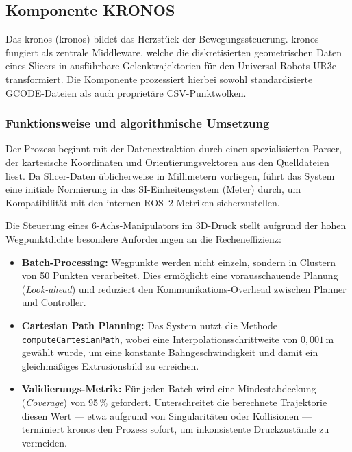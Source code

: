         \subsection{Komponente KRONOS}\label{subsec:component-kronos}
            Das \acl{kronos} (\acs{kronos}) bildet das Herzstück der Bewegungssteuerung.
            \ac{kronos} fungiert als zentrale Middleware, welche die diskretisierten geometrischen Daten eines Slicers in ausführbare Gelenktrajektorien für den Universal Robots UR3e transformiert.
            Die Komponente prozessiert hierbei sowohl standardisierte \ac{GCODE}-Dateien als auch proprietäre CSV-Punktwolken.

            \subsubsection{Funktionsweise und algorithmische Umsetzung}\label{subsubssec:functionality}
                Der Prozess beginnt mit der Datenextraktion durch einen spezialisierten Parser, der kartesische Koordinaten und Orientierungsvektoren aus den Quelldateien liest. 
                Da Slicer-Daten üblicherweise in Millimetern vorliegen, führt das System eine initiale Normierung in das \ac{SI}-Einheitensystem (Meter) durch, um Kompatibilität mit den internen \ac{ROS}~2-Metriken sicherzustellen.

                Die Steuerung eines 6-Achs-Manipulators im 3D-Druck stellt aufgrund der hohen Wegpunktdichte besondere Anforderungen an die Recheneffizienz:
                \begin{itemize}
                    \item \textbf{Batch-Processing:} Wegpunkte werden nicht einzeln, sondern in Clustern von 50 Punkten verarbeitet. 
                Dies ermöglicht eine vorausschauende Planung (\textit{Look-ahead}) und reduziert den Kommunikations-Overhead zwischen Planner und Controller.
                    \item \textbf{Cartesian Path Planning:} Das System nutzt die Methode \texttt{computeCartesian\allowbreak Path}, wobei eine Interpolationsschrittweite von $0,001$\,m gewählt wurde, um eine konstante Bahngeschwindigkeit und damit ein gleichmäßiges Extrusionsbild zu erreichen.
                    \item \textbf{Validierungs-Metrik:} Für jeden Batch wird eine Mindestabdeckung (\textit{Coverage}) von 95\,\% gefordert. 
                Unterschreitet die berechnete Trajektorie diesen Wert — etwa aufgrund von Singularitäten oder Kollisionen — terminiert \ac{kronos} den Prozess sofort, um inkonsistente Druckzustände zu vermeiden.
                \end{itemize}

